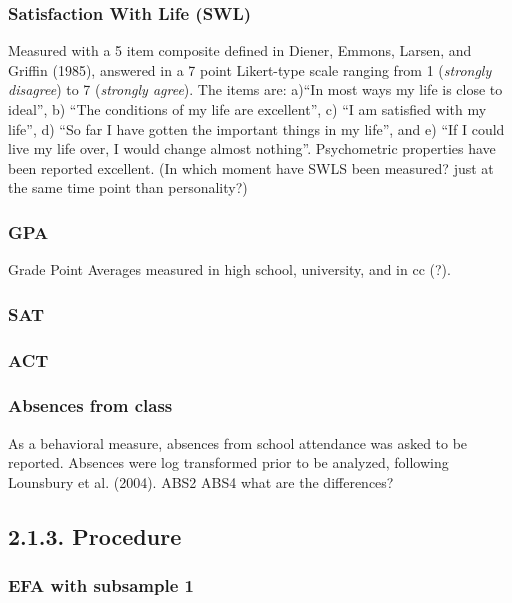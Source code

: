 \documentclass[,man,floatsintext]{apa6}
\begin{document}
\subsubsection{Satisfaction With Life
(SWL)}\label{satisfaction-with-life-swl}

Measured with a 5 item composite defined in Diener, Emmons, Larsen, and
Griffin (1985), answered in a 7 point Likert-type scale ranging from 1
(\emph{strongly disagree}) to 7 (\emph{strongly agree}). The items are:
a)\enquote{In most ways my life is close to ideal}, b) \enquote{The
conditions of my life are excellent}, c) \enquote{I am satisfied with my
life}, d) \enquote{So far I have gotten the important things in my
life}, and e) \enquote{If I could live my life over, I would change
almost nothing}. Psychometric properties have been reported excellent.
(In which moment have SWLS been measured? just at the same time point
than personality?)

\subsubsection{GPA}\label{gpa}

Grade Point Averages measured in high school, university, and in cc (?).

\subsubsection{SAT}\label{sat}

\subsubsection{ACT}\label{act}

\subsubsection{Absences from class}\label{absences-from-class}

As a behavioral measure, absences from school attendance was asked to be
reported. Absences were log transformed prior to be analyzed, following
Lounsbury et al. (2004). ABS2 ABS4 what are the differences?

\subsection{2.1.3. Procedure}\label{procedure}

\subsubsection{EFA with subsample 1}\label{efa-with-subsample-1}
\end{document}
